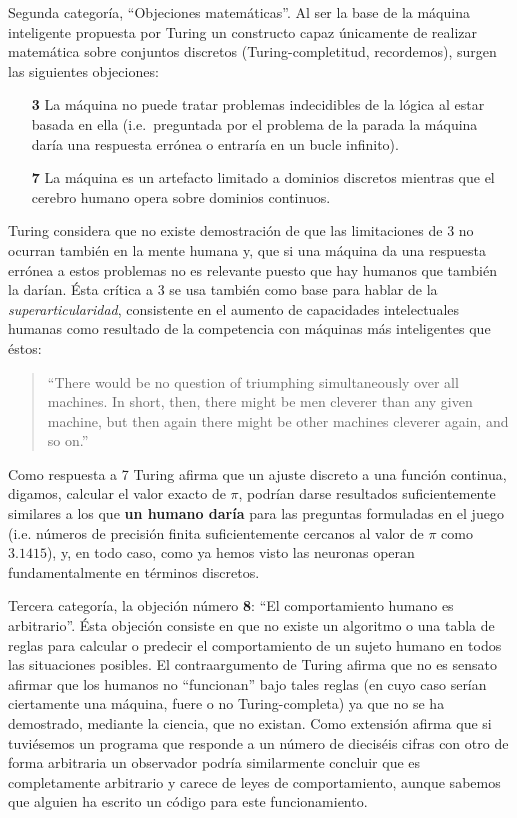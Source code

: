 \documentclass[12pt]{memoir}
\begin{document}
Segunda categoría, ``Objeciones matemáticas''. Al ser la base de la máquina inteligente propuesta por Turing un constructo capaz únicamente de realizar matemática sobre conjuntos discretos (Turing-completitud, recordemos), surgen las siguientes objeciones: 

\begin{enumerate}
    \item[\textbf{3}] La máquina no puede tratar problemas indecidibles de la lógica al estar basada en ella (i.e.\ preguntada por el problema de la parada la máquina daría una respuesta errónea o entraría en un bucle infinito).
    \item[\textbf{7}] La máquina es un artefacto limitado a dominios discretos mientras que el cerebro humano opera sobre dominios continuos.
\end{enumerate}

Turing considera que no existe demostración de que las limitaciones de 3 no ocurran también en la mente humana y, que si una máquina da una respuesta errónea a estos problemas no es relevante puesto que hay humanos que también la darían. Ésta crítica a 3 se usa también como base para hablar de la \textit{superarticularidad}, consistente en el aumento de capacidades intelectuales humanas como resultado de la competencia con máquinas más inteligentes que éstos:
\begin{quotation}
``There would be no question of triumphing simultaneously over all machines. In short, then, there might be men cleverer than any given machine, but then again there might be other machines cleverer again, and so on.'' \parencite[apartado 6, punto 3]{Turing1950cmi}
\end{quotation}

Como respuesta a 7 Turing afirma que un ajuste discreto a una función continua, digamos, calcular el valor exacto de $\pi$, podrían darse resultados suficientemente similares a los que \textbf{un humano daría} para las preguntas formuladas en el juego (i.e. números de precisión finita suficientemente cercanos al valor de $\pi$ como $3.1415$), y, en todo caso, como ya hemos visto las neuronas operan fundamentalmente en términos discretos.

Tercera categoría, la objeción número \textbf{8}: ``El comportamiento humano es arbitrario''. Ésta objeción consiste en que no existe un algoritmo o una tabla de reglas para calcular o predecir el comportamiento de un sujeto humano en todos las situaciones posibles. El contraargumento de Turing afirma que no es sensato afirmar que los humanos no ``funcionan'' bajo tales reglas (en cuyo caso serían ciertamente una máquina, fuere o no Turing-completa) ya que no se ha demostrado, mediante la ciencia, que no existan. Como extensión afirma que si tuviésemos un programa que responde a un número de dieciséis cifras con otro de forma arbitraria un observador podría similarmente concluir que es completamente arbitrario y carece de leyes de comportamiento, aunque sabemos que alguien ha escrito un código para este funcionamiento.
\end{document}
